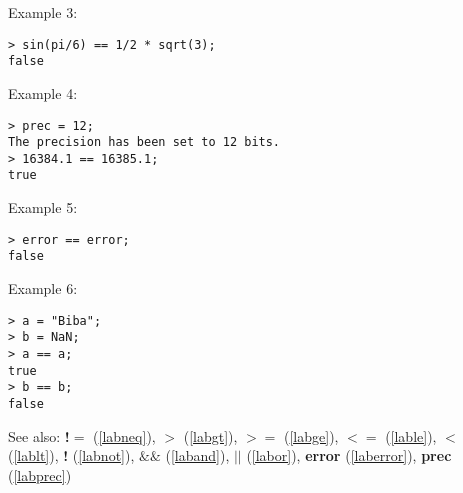 \noindent Example 3: 
\begin{center}\begin{minipage}{15cm}\begin{Verbatim}[frame=single]
> sin(pi/6) == 1/2 * sqrt(3);
false
\end{Verbatim}
\end{minipage}\end{center}
\noindent Example 4: 
\begin{center}\begin{minipage}{15cm}\begin{Verbatim}[frame=single]
> prec = 12;
The precision has been set to 12 bits.
> 16384.1 == 16385.1;
true
\end{Verbatim}
\end{minipage}\end{center}
\noindent Example 5: 
\begin{center}\begin{minipage}{15cm}\begin{Verbatim}[frame=single]
> error == error;
false
\end{Verbatim}
\end{minipage}\end{center}
\noindent Example 6: 
\begin{center}\begin{minipage}{15cm}\begin{Verbatim}[frame=single]
> a = "Biba";
> b = NaN;
> a == a;
true
> b == b;
false
\end{Verbatim}
\end{minipage}\end{center}
See also: \textbf{!$=$} (\ref{labneq}), \textbf{$>$} (\ref{labgt}), \textbf{$>=$} (\ref{labge}), \textbf{$<=$} (\ref{lable}), \textbf{$<$} (\ref{lablt}), \textbf{!} (\ref{labnot}), \textbf{$\&\&$} (\ref{laband}), \textbf{$||$} (\ref{labor}), \textbf{error} (\ref{laberror}), \textbf{prec} (\ref{labprec})
